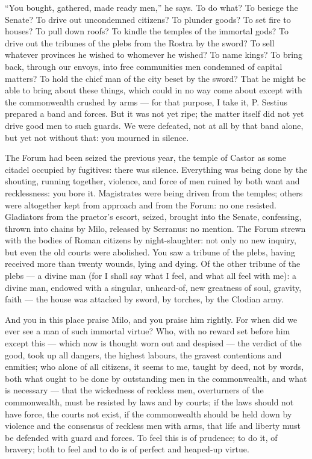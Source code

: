  ``You bought, gathered, made ready men,'' he says. To do what? To besiege the Senate? To drive out uncondemned citizens? To plunder goods? To set fire to houses? To pull down roofs? To kindle the temples of the immortal gods? To drive out the tribunes of the plebs from the Rostra by the sword? To sell whatever provinces he wished to whomever he wished? To name kings? To bring back, through our envoys, into free communities men condemned of capital matters? To hold the chief man of the city beset by the sword? That he might be able to bring about these things, which could in no way come about except with the commonwealth crushed by arms --- for that purpose, I take it, P. Sestius prepared a band and forces. But it was not yet ripe; the matter itself did not yet drive good men to such guards. We were defeated, not at all by that band alone, but yet not without that: you mourned in silence.

 The Forum had been seized the previous year, the temple of Castor as some citadel occupied by fugitives: there was silence. Everything was being done by the shouting, running together, violence, and force of men ruined by both want and recklessness: you bore it. Magistrates were being driven from the temples; others were altogether kept from approach and from the Forum: no one resisted. Gladiators from the praetor's escort, seized, brought into the Senate, confessing, thrown into chains by Milo, released by Serranus: no mention. The Forum strewn with the bodies of Roman citizens by night-slaughter: not only no new inquiry, but even the old courts were abolished. You saw a tribune of the plebs, having received more than twenty wounds, lying and dying. Of the other tribune of the plebs --- a divine man (for I shall say what I feel, and what all feel with me): a divine man, endowed with a singular, unheard-of, new greatness of soul, gravity, faith --- the house was attacked by sword, by torches, by the Clodian army.

 And you in this place praise Milo, and you praise him rightly. For when did we ever see a man of such immortal virtue? Who, with no reward set before him except this --- which now is thought worn out and despised --- the verdict of the good, took up all dangers, the highest labours, the gravest contentions and enmities; who alone of all citizens, it seems to me, taught by deed, not by words, both what ought to be done by outstanding men in the commonwealth, and what is necessary --- that the wickedness of reckless men, overturners of the commonwealth, must be resisted by laws and by courts; if the laws should not have force, the courts not exist, if the commonwealth should be held down by violence and the consensus of reckless men with arms, that life and liberty must be defended with guard and forces. To feel this is of prudence; to do it, of bravery; both to feel and to do is of perfect and heaped-up virtue.

